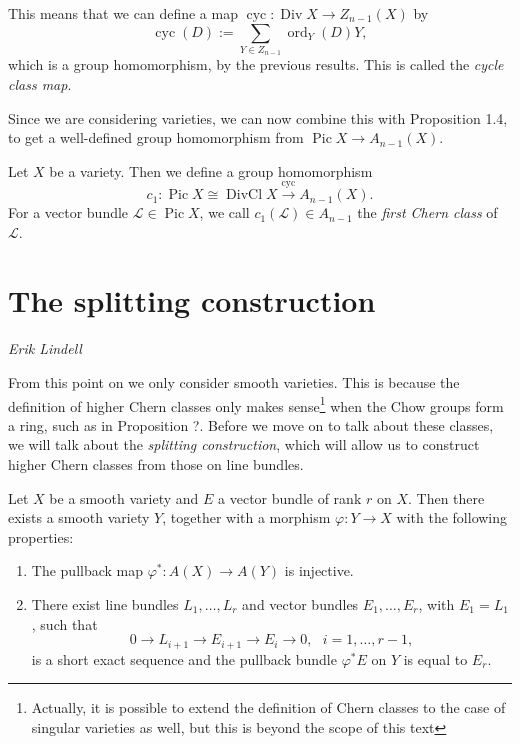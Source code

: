 \documentclass[a4paper,openany]{scrbook}
\DeclareMathOperator{\Div}{Div}
\DeclareMathOperator{\DivCl}{DivCl}
\DeclareMathOperator{\Pic}{Pic}
\DeclareMathOperator{\ord}{ord}
\newcommand{\chapterauthor}[1]{\hfill\emph{#1}\par\noindent}
\begin{document}
This means that we can define a map $\operatorname{cyc}:\Div X\to Z_{n-1}(X)$ by
$$\operatorname{cyc}(D):=\sum_{Y\in Z_{n-1}}\ord_Y(D)Y,$$
which is a group homomorphism, by the previous results. This is called the \textit{cycle class map}.

Since we are considering varieties, we can now combine this with Proposition 1.4, to get a well-defined group homomorphism from $\Pic X\to A_{n-1}(X)$.

\begin{defn}
Let $X$ be a variety. Then we define a group homomorphism
$$c_1:\Pic X\cong\DivCl X\overset{\operatorname{cyc}}{\longrightarrow}A_{n-1}(X).$$
For a vector bundle $\mathcal{L}\in\Pic X$, we call $c_1(\mathcal{L})\in A_{n-1}$ the \textit{first Chern class} of $\mathcal{L}$.
\end{defn}

\section{The splitting construction}
\chapterauthor{Erik Lindell}

From this point on we only consider smooth varieties. This is because the definition of higher Chern classes only makes sense\footnote{Actually, it is possible to extend the definition of Chern classes to the case of singular varieties as well, but this is beyond the scope of this text} when the Chow groups form a ring, such as in Proposition ?. Before we move on to talk about these classes, we will talk about the \textit{splitting construction}, which will allow us to construct higher Chern classes from those on line bundles. 

\begin{lemma}
Let $X$ be a smooth variety and $E$ a vector bundle of rank $r$ on $X$. Then there exists a smooth variety $Y$, together with a morphism $\varphi:Y\to X$ with the following properties:
\begin{enumerate}[label=(\alph*)]
    \item The pullback map $\varphi^*:A(X)\to A(Y)$ is injective.
    \item There exist line bundles $L_1,\ldots, L_r$ and vector bundles $E_1,\ldots, E_r$, with $E_1=L_1$, such that
     $$0\to L_{i+1}\to E_{i+1}\to E_i\to 0,\ \ \ i=1,\ldots, r-1,$$
     is a short exact sequence and the pullback bundle $\varphi^*E$ on $Y$ is equal to $E_r$.
\end{enumerate}
\end{lemma}
\end{document}
